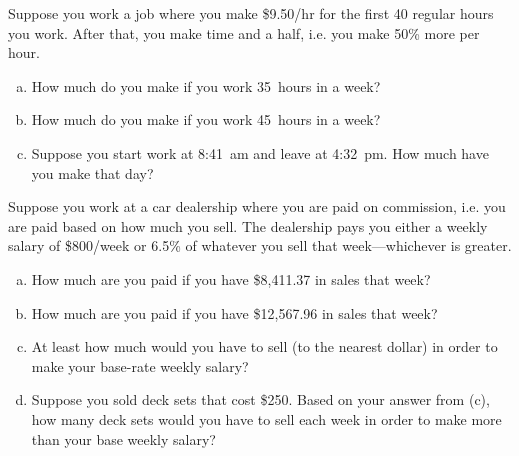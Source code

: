 \documentclass[11pt,letterpaper]{article}
\begin{document}
\newpage





 Suppose you work a job where you make \$9.50/hr for the first 40 regular hours you work. After that, you make time and a half, i.e. you make 50\% more per hour. 
\begin{enumerate}[(a)]
\item How much do you make if you work 35~hours in a week?
\item How much do you make if you work 45~hours in a week?
\item Suppose you start work at 8:41~am and leave at 4:32~pm. How much have you make that day?
\end{enumerate}





\newpage





 Suppose you work at a car dealership where you are paid on commission, i.e. you are paid based on how much you sell. The dealership pays you either a weekly salary of \$800/week or 6.5\% of whatever you sell that week---whichever is greater.
\begin{enumerate}[(a)]
\item How much are you paid if you have \$8,411.37 in sales that week?
\item How much are you paid if you have \$12,567.96 in sales that week?
\item At least how much would you have to sell (to the nearest dollar) in order to make your base-rate weekly salary?
\item Suppose you sold deck sets that cost \$250. Based on your answer from (c), how many deck sets would you have to sell each week in order to make more than your base weekly salary? 
\end{enumerate}


\end{document}
